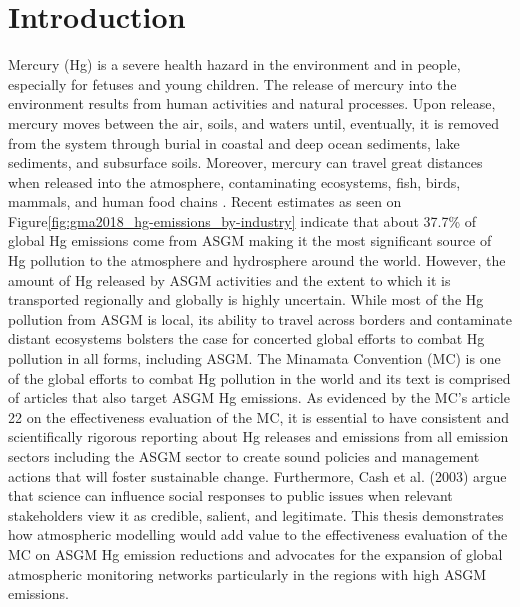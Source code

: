
\chapter{Introduction}
Mercury (Hg) is a severe health hazard in the environment and in people, especially for fetuses and young children\cite{gibb_mercury_2014}. The release of mercury into the environment results from human activities and natural processes. Upon release, mercury moves between the air, soils, and waters until, eventually, it is removed from the system through burial in coastal and deep ocean sediments, lake sediments, and subsurface soils. Moreover, mercury can travel great distances when released into the atmosphere, contaminating ecosystems, fish, birds, mammals, and human food chains \cite{esdaile_mercury_2018}. Recent estimates as seen on Figure\ref{fig:gma2018_hg-emissions_by-industry} indicate that about 37.7\% of global Hg emissions come from ASGM making it the most significant source of Hg pollution to the atmosphere and hydrosphere around the world\cite{unep_minamata_2019}. However, the amount of Hg released by ASGM activities and the extent to which it is transported regionally and globally is highly uncertain. While most of the Hg pollution from ASGM is local, its ability to travel across borders and contaminate distant ecosystems bolsters the case for concerted global efforts to combat Hg pollution in all forms, including ASGM. The Minamata Convention (MC) is one of the global efforts to combat Hg pollution in the world and its text is comprised of articles that also target ASGM Hg emissions. As evidenced by the MC's article 22 on the effectiveness evaluation of the MC, it is essential to have consistent and scientifically rigorous reporting about Hg releases and emissions from all emission sectors including the ASGM sector to create sound policies and management actions that will foster sustainable change. Furthermore, Cash et al. (2003) argue that science can influence social responses to public issues when relevant stakeholders view it as credible, salient, and legitimate. This thesis demonstrates how atmospheric modelling would add value to the effectiveness evaluation of the MC on ASGM Hg emission reductions and advocates for the expansion of global atmospheric monitoring networks particularly in the regions with high ASGM emissions. 

